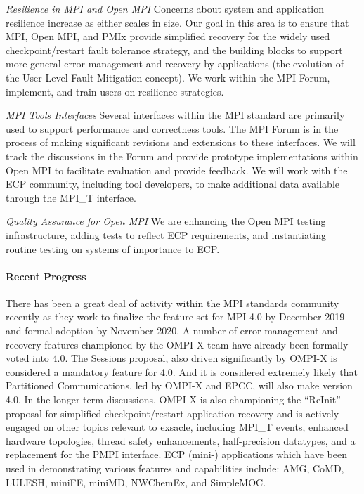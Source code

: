 \emph{Resilience in MPI and Open MPI} Concerns about system and
application resilience increase as either scales in size.  Our goal in
this area is to ensure that MPI, Open MPI, and PMIx provide simplified 
recovery for the widely used checkpoint/restart fault tolerance strategy, and the building
blocks to support more general error management and recovery by applications (the evolution of the User-Level
Fault Mitigation concept). We work within the MPI Forum, implement,
and train users on resilience strategies.

\emph{MPI Tools Interfaces}  Several interfaces within the
MPI standard are primarily used to support performance and
correctness tools.
The MPI Forum is in the process
of making significant revisions and extensions to these interfaces.
We will track the discussions in the Forum and provide prototype
implementations within Open MPI to facilitate evaluation and provide
feedback.
We will work with the
ECP community, including tool developers, to make additional data
available through the MPI\_T interface.

\emph{Quality Assurance for Open MPI}  We are enhancing the
Open MPI testing infrastructure, adding tests to reflect ECP
requirements, and instantiating routine testing on systems of
importance to ECP.

\paragraph{Recent Progress}
There has been a great deal of activity within the MPI standards community recently
as they work to finalize the feature set for MPI 4.0 by December 2019 and
formal adoption by November 2020.  A number of error management and recovery features
championed by the OMPI-X team have already been formally voted into 4.0.  The Sessions proposal,
also driven significantly by OMPI-X is considered a mandatory feature for 4.0.  And it is considered extremely likely that Partitioned Communications, led by OMPI-X and EPCC, will also make version 4.0.
In the longer-term discussions, OMPI-X is also championing the ``ReInit'' proposal for simplified checkpoint/restart application recovery and is actively engaged on other topics relevant to
exsacle, including MPI\_T events, enhanced hardware topologies, thread safety enhancements, half-precision datatypes, and a replacement for the PMPI interface.  ECP (mini-) applications which have been used in demonstrating various features and capabilities include: AMG, CoMD, LULESH, miniFE, miniMD, NWChemEx, and SimpleMOC.

